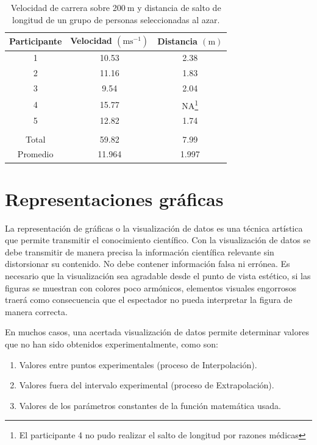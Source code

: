 \begin{table}[!h]
\centering
\caption{Velocidad de carrera sobre 200$ \mathrm{~m}$ y distancia de salto de longitud  de un grupo de personas seleccionadas al azar.}
\begin{tabular}{ccc}
\hline Participante & Velocidad $\left(\mathrm{ms}^{-1}\right)$ & Distancia $(\mathrm{m})$ \\ \hline \hline 
1 & 10.53 & 2.38 \\
2 & 11.16 & 1.83 \\
3 &  9.54  & 2.04 \\
4 & 15.77 & NA\footnote{El participante 4 no pudo realizar el salto de longitud  por razones m\'edicas} \\
5 & 12.82 & 1.74 \\
& & \\
Total & 59.82 & 7.99 \\
Promedio & 11.964 & 1.997 \\
\hline
\end{tabular}
\label{ejetabla1}
\end{table}


\section{Representaciones  gr\'aficas}

La representaci\'on de gr\'aficas o la visualizaci\'on de datos es una t\'ecnica art\'istica que permite transmitir el conocimiento cient\'ifico. Con la visualizaci\'on de datos se debe transmitir de manera precisa la informaci\'on cient\'ifica relevante sin distorsionar su contenido. No debe contener informaci\'on falsa ni err\'onea. Es necesario que la visualizaci\'on sea agradable desde el punto de vista est\'etico, si las figuras se muestran con colores poco arm\'onicos, elementos visuales engorrosos traer\'a como consecuencia que el espectador no pueda interpretar la figura de manera correcta. 

En muchos casos, una acertada visualizaci\'on de datos  permite determinar valores que no han sido obtenidos experimentalmente, como son:
\begin{enumerate}
\item Valores entre puntos experimentales (proceso de Interpolaci\'on).
\item Valores fuera del intervalo experimental (proceso de Extrapolaci\'on).
\item Valores de los par\'ametros constantes de la funci\'on matem\'atica usada.
\end{enumerate}

